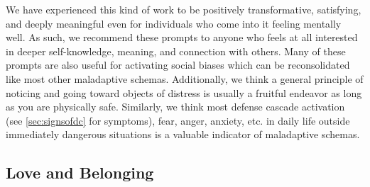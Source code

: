 \documentclass[12pt,letterpaper]{book}
\begin{document}
We have experienced this kind of work to be positively transformative, satisfying, and deeply meaningful even for individuals who come into it feeling mentally well. As such, we recommend these prompts to anyone who feels at all interested in deeper self-knowledge, meaning, and connection with others. Many of these prompts are also useful for activating social biases which can be reconsolidated like most other maladaptive schemas. Additionally, we think a general principle of noticing and going toward objects of distress is usually a fruitful endeavor as long as you are physically safe. Similarly, we think most defense cascade activation (see \ref{sec:signsofdc} for symptoms), fear, anger, anxiety, etc. in daily life outside immediately dangerous situations is a valuable indicator of maladaptive schemas.

\subsection*{Love and Belonging}
\end{document}
